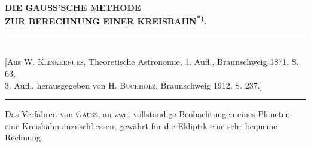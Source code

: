 \clearpage
\begingroup
\NoSourceHead
\makeatletter\tagsleft@true\let\veqno\leqno\makeatother
{}
\begin{center}
{\large\bfseries DIE GAUSS’SCHE METHODE\\ZUR BERECHNUNG EINER KREISBAHN\textsuperscript{*)}.}\par\medskip
\rule{\linewidth}{.3pt}\\
{\small [Aus W. \textsc{Klinkerfues}, Theoretische Astronomie, 1. Aufl., Braunschweig 1871, S. 63,\\
3. Aufl., herausgegeben von H. \textsc{Buchholz}, Braunschweig 1912, S. 237.]}\\
\rule{\linewidth}{.3pt}
\end{center}
\begingroup\renewcommand{\thefootnote}{*)}\endgroup
\noindent\hspace*{\parindent}Das Verfahren von \textsc{Gauss}, an zwei vollständige Beobachtungen eines Planeten eine Kreisbahn anzuschliessen, gewährt für die Ekliptik eine sehr bequeme Rechnung.

